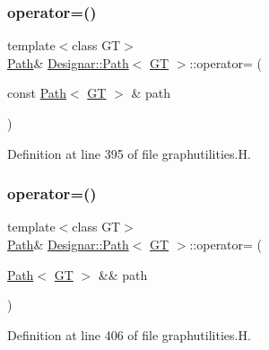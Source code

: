 \subsubsection{\texorpdfstring{operator=()}{operator=()}\hspace{0.1cm}{\footnotesize\ttfamily [1/2]}}
{\footnotesize\ttfamily template$<$class GT$>$ \\
\hyperlink{class_designar_1_1_path}{Path}\& \hyperlink{class_designar_1_1_path}{Designar\+::\+Path}$<$ \hyperlink{demo-buildgraph_8_c_a3001c40d2c31ca87ed96cd7d1334a55e}{GT} $>$\+::operator= (\begin{DoxyParamCaption}\item[{const \hyperlink{class_designar_1_1_path}{Path}$<$ \hyperlink{demo-buildgraph_8_c_a3001c40d2c31ca87ed96cd7d1334a55e}{GT} $>$ \&}]{path }\end{DoxyParamCaption})\hspace{0.3cm}{\ttfamily [inline]}}



Definition at line 395 of file graphutilities.\+H.

\mbox{\label{class_designar_1_1_path_af84a6745c52225e5588db4a2ed5d828e}} 
\subsubsection{\texorpdfstring{operator=()}{operator=()}\hspace{0.1cm}{\footnotesize\ttfamily [2/2]}}
{\footnotesize\ttfamily template$<$class GT$>$ \\
\hyperlink{class_designar_1_1_path}{Path}\& \hyperlink{class_designar_1_1_path}{Designar\+::\+Path}$<$ \hyperlink{demo-buildgraph_8_c_a3001c40d2c31ca87ed96cd7d1334a55e}{GT} $>$\+::operator= (\begin{DoxyParamCaption}\item[{\hyperlink{class_designar_1_1_path}{Path}$<$ \hyperlink{demo-buildgraph_8_c_a3001c40d2c31ca87ed96cd7d1334a55e}{GT} $>$ \&\&}]{path }\end{DoxyParamCaption})\hspace{0.3cm}{\ttfamily [inline]}}



Definition at line 406 of file graphutilities.\+H.

\mbox{\label{class_designar_1_1_path_a88a313439c8f4ea01f72d469b328039f}} 
